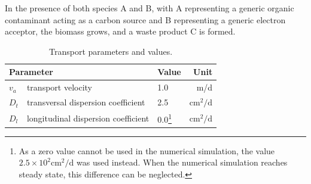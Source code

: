 In the presence of both species A and B, with A representing a generic organic
contaminant acting as a carbon source and B representing a generic electron
acceptor, the biomass grows, and a waste product C is formed.
\begin{table}[!th]
\caption{Transport parameters and values.}
\label{tab:monodtransport}
\centering
\begin{minipage}{\linewidth}
\renewcommand{\thefootnote}{\thempfootnote}
\centering
\begin{tabular}{lllr}
\hline
\multicolumn{2}{l}{\bf{Parameter}} & \bf{Value} & \bf{Unit}\\
\hline
$v_a$ & transport velocity & 1.0 & m/d\\
$D_t$ & transversal dispersion coefficient & 2.5 & $\mathrm{cm^2/d}$ \\
$D_l$ & longitudinal dispersion coefficient & 0.0\footnote{\centering
As a zero value cannot be used in the numerical simulation, the value
$2.5\times10^{2} \mathrm{cm^{2}/d}$ was used instead. When the numerical
simulation reaches steady state, this difference can be neglected. } & $\mathrm{cm^2/d}$ \\
\hline
\end{tabular}
\end{minipage}
\end{table}


